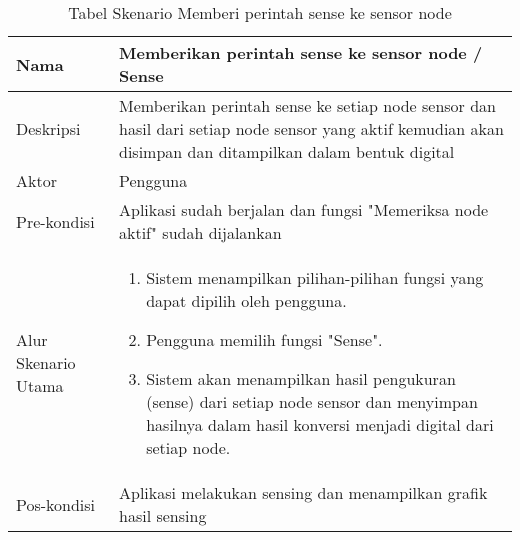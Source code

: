 \begin{table}[H]
	\centering
	\caption{Tabel Skenario Memberi perintah sense ke sensor node}
		\begin{tabular}{|p{}|p{}|}
    	\hline
        Nama & Memberikan perintah sense  ke sensor node / Sense \\ 
        \hline
        Deskripsi & Memberikan perintah sense ke setiap node sensor dan hasil dari setiap node sensor yang aktif kemudian akan disimpan dan ditampilkan dalam bentuk digital\\ 
        \hline
        Aktor & Pengguna\\
		\hline
		Pre-kondisi & Aplikasi sudah berjalan dan fungsi "Memeriksa node aktif" sudah dijalankan\\
		\hline
        Alur Skenario Utama & \begin{enumerate}
				\item Sistem menampilkan pilihan-pilihan fungsi yang dapat dipilih oleh pengguna.
				\item Pengguna memilih fungsi "Sense".
				\item Sistem akan menampilkan hasil pengukuran (sense) dari setiap node sensor dan menyimpan hasilnya dalam hasil konversi menjadi digital dari setiap node.
			\end{enumerate}\\
		\hline
		Pos-kondisi & Aplikasi melakukan sensing dan menampilkan grafik hasil sensing\\
		\hline
    \end{tabular}
\end{table}




